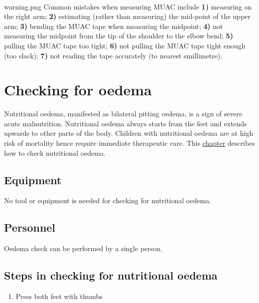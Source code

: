 \documentclass[
  12pt,
]{book}
\providecommand{\tightlist}{%
  \setlength{\itemsep}{0pt}\setlength{\parskip}{0pt}}
\newenvironment{rmdwarning}
  {\begin{tcolorbox}[width=\textwidth, 
                     colback = {white}, 
                     title = {\textbf{Warning}}, 
                     colbacktitle = lightgray,
                     coltitle = black]
  \begin{includegraphics}[scale = 1]{warning.png}}
  {\end{includegraphics}
  \end{tcolorbox}}
\begin{document}
~

\begin{rmdwarning}
Common mistakes when measuring MUAC include \textbf{1)} measuring on the right arm; \textbf{2)} estimating (rather than measuring) the mid-point of the upper arm; \textbf{3)} bending the MUAC tape when measuring the midpoint; \textbf{4)} not measuring the midpoint from the tip of the shoulder to the elbow bend; \textbf{5)} pulling the MUAC tape too tight; \textbf{6)} not pulling the MUAC tape tight enough (too slack); \textbf{7)} not reading the tape accurately (to nearest smillimetre).
\end{rmdwarning}

\hypertarget{oedema}{%
\chapter{Checking for oedema}\label{oedema}}

Nutritional oedema, manifested as bilateral pitting oedema, is a sign of severe acute malnutrition. Nutritional oedema always starts from the feet and extends upwards to other parts of the body. Children with nutritional oedema are at high risk of mortality hence require immediate therapeutic care. This \protect\hyperlink{oedema}{chapter} describes how to check nutritional oedema.

\hypertarget{equipment-3}{%
\section{Equipment}\label{equipment-3}}

No tool or equipment is needed for checking for nutritional oedema.

\hypertarget{personnel-3}{%
\section{Personnel}\label{personnel-3}}

Oedema check can be performed by a single person.

\hypertarget{steps-in-checking-for-nutritional-oedema}{%
\section{Steps in checking for nutritional oedema}\label{steps-in-checking-for-nutritional-oedema}}

\begin{enumerate}
\def\labelenumi{\arabic{enumi}.}
\tightlist
\item
  Press both feet with thumbs
\end{enumerate}
\end{document}

